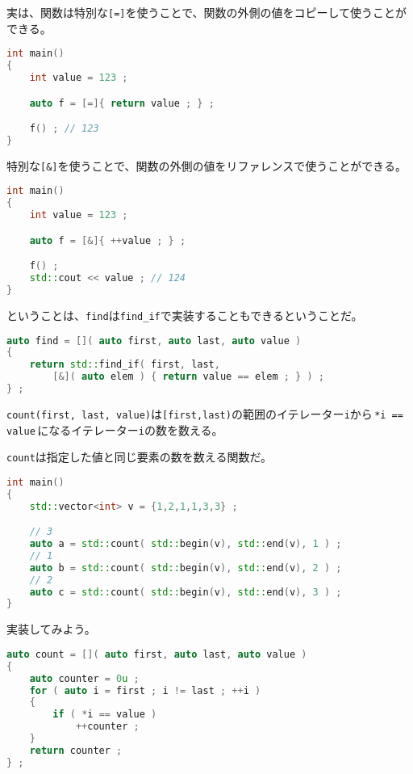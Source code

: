実は、関数は特別な\texttt{[=]}を使うことで、関数の外側の値をコピーして使うことができる。

\begin{lstlisting}[language={C++}]
int main()
{
    int value = 123 ;

    auto f = [=]{ return value ; } ;

    f() ; // 123
}
\end{lstlisting}

特別な\texttt{[\&]}を使うことで、関数の外側の値をリファレンスで使うことができる。

\begin{lstlisting}[language={C++}]
int main()
{
    int value = 123 ;

    auto f = [&]{ ++value ; } ; 

    f() ;
    std::cout << value ; // 124
}
\end{lstlisting}

ということは、\texttt{find}は\texttt{find\_if}で実装することもできるということだ。

\ifTombow\pagebreak\fi
\begin{lstlisting}[language={C++}]
auto find = []( auto first, auto last, auto value )
{
    return std::find_if( first, last,
        [&]( auto elem ) { return value == elem ; } ) ;
} ;
\end{lstlisting}


\texttt{count(first, last, value)}は\texttt{[first,last)}の範囲のイテレーター\texttt{i}から\,\texttt{*i == value}\,になるイテレーター\texttt{i}の数を数える。

\texttt{count}は指定した値と同じ要素の数を数える関数だ。

\begin{lstlisting}[language={C++}]
int main()
{
    std::vector<int> v = {1,2,1,1,3,3} ;

    // 3
    auto a = std::count( std::begin(v), std::end(v), 1 ) ;
    // 1
    auto b = std::count( std::begin(v), std::end(v), 2 ) ;
    // 2
    auto c = std::count( std::begin(v), std::end(v), 3 ) ;
}
\end{lstlisting}

実装してみよう。

\begin{lstlisting}[language={C++}]
auto count = []( auto first, auto last, auto value )
{
    auto counter = 0u ;
    for ( auto i = first ; i != last ; ++i )
    {
        if ( *i == value )
            ++counter ;  
    }
    return counter ;
} ;
\end{lstlisting}

